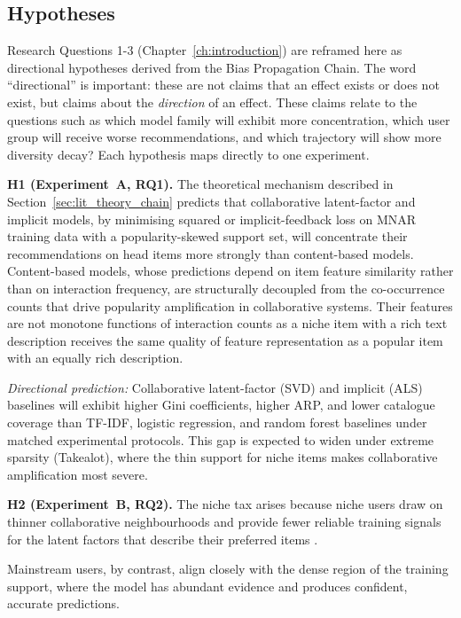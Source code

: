 \documentclass[11pt,a4paper]{report}
\begin{document}
\subsection{Hypotheses}
\label{sec:lit_theory_hyp}

Research Questions 1-3 (Chapter~\ref{ch:introduction}) are reframed here as directional hypotheses derived from the Bias Propagation Chain. The word ``directional'' is important: these are not claims that an effect exists or does not exist, but claims about the \emph{direction} of an effect. These claims relate to the questions such as which model family will exhibit more concentration, which user group will receive worse recommendations, and which trajectory will show more diversity decay? Each hypothesis maps directly to one experiment.

\textbf{H1 (Experiment~A, RQ1).}
The theoretical mechanism described in Section~\ref{sec:lit_theory_chain} predicts that collaborative latent-factor and implicit models, by minimising squared or implicit-feedback loss on MNAR training data with a popularity-skewed support set, will concentrate their recommendations on head items more strongly than content-based models. Content-based models, whose predictions depend on item feature similarity rather than on interaction frequency, are structurally decoupled from the co-occurrence counts that drive popularity amplification in collaborative systems. Their features are not monotone functions of interaction counts as a niche item with a rich text description receives the same quality of feature representation as a popular item with an equally rich description.

\emph{Directional prediction:} Collaborative latent-factor (SVD) and implicit (ALS) baselines will exhibit higher Gini coefficients, higher ARP, and lower catalogue coverage than TF-IDF, logistic regression, and random forest baselines under matched experimental protocols. This gap is expected to widen under extreme sparsity (Takealot), where the thin support for niche items makes collaborative amplification most severe.

\textbf{H2 (Experiment~B, RQ2).}
The niche tax arises because niche users draw on thinner collaborative neighbourhoods and provide fewer reliable training signals for the latent factors that describe their preferred items \citep{abdollahpouri2021usercentered, leonhardt2018userfairness, steck2010training, steck2011itempopularity}.

Mainstream users, by contrast, align closely with the dense region of the training support, where the model has abundant evidence and produces confident, accurate predictions.
\end{document}
